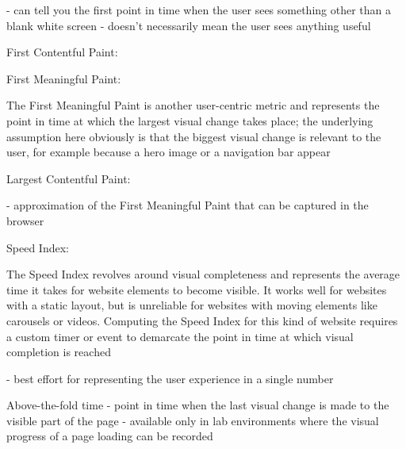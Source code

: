 - can tell you the first point in time when the user sees something other than a blank white screen
- doesn’t necessarily mean the user sees anything useful




First Contentful Paint: %




First Meaningful Paint: %

The First Meaningful Paint is another user-centric metric and represents the point in time at which the largest visual change takes place; the underlying assumption here obviously is that the biggest visual change is relevant to the user, for example because a hero image or a navigation bar appear





Largest Contentful Paint: %

- approximation of the First Meaningful Paint that can be captured in the browser






Speed Index: %

The Speed Index revolves around visual completeness and represents the average time it takes for website elements to become visible. It works well for websites with a static layout, but is unreliable for websites with moving elements like carousels or videos. Computing the Speed Index for this kind of website requires a custom timer or event to demarcate the point in time at which visual completion is reached

- best effort for representing the user experience in a single number



Above-the-fold time %
- point in time when the last visual change is made to the visible part of the page
- available only in lab environments where the visual progress of a page loading can be recorded





